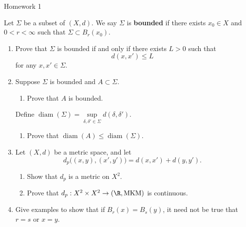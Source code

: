 \documentclass[12pt,letterpaper]{article}
\DeclareMathOperator{\diameter}{diam}
\newcommand{\diam}[1]{\diameter\left(#1\right)}
\begin{document}
\pagestyle{fancy}
\begin{center}
{\Large Homework 1}%
\end{center}

\begin{definition*}
Let $\Sigma$ be a subset of $(X,d)$. We say $\Sigma$ is \textbf{bounded} if there exists $x_0\in X$ and $0<r<\infty$ such that $\Sigma\subset B_r(x_0)$. 
\end{definition*}

\begin{enumerate}
\item Prove that $\Sigma$ is bounded if and only if there exists $L>0$ such that
$$d(x,x')\leq L$$
for any $x, x'\in\Sigma$.

\item Suppose $\Sigma$ is bounded and $A\subset\Sigma$. 
\begin{enumerate}
\item Prove that $A$ is bounded. 
\end{enumerate}
\begin{definition*}
Define $\diam{\Sigma} = \sup\limits_{\delta, \delta'\in\Sigma} d(\delta, \delta')$.
\end{definition*}
\begin{enumerate}[resume]
\item Prove that $\diam{A}\leq\diam{\Sigma}$. 
\end{enumerate}

\item Let $(X,d)$ be a metric space, and let 
$$d_p\big((x,y),(x',y')\big)=d(x,x')+d(y,y').$$
\begin{enumerate}
\item Show that $d_p$ is a metric on $X^2$. 
\item Prove that $d_p:X^2\times X^2 \to (\R, \text{MKM})$ is continuous. 
\end{enumerate}

\item Give examples to show that if $B_r(x)=B_s(y)$, it need not be true that $r=s$ or $x=y$. 
\end{enumerate}
\end{document}
